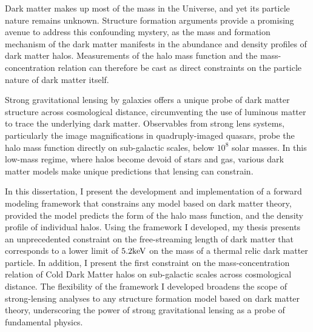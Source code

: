 Dark matter makes up most of the mass in the Universe, and yet its particle nature remains unknown. Structure formation arguments provide a promising avenue to address this confounding mystery, as the mass and formation mechanism of the dark matter manifests in the abundance and density profiles of dark matter halos. Measurements of the halo mass function and the mass-concentration relation can therefore be cast as direct constraints on the particle nature of dark matter itself.

Strong gravitational lensing by galaxies offers a unique probe of dark matter structure across cosmological distance, circumventing the use of luminous matter to trace the underlying dark matter. Observables from strong lens systems, particularly the image magnifications in quadruply-imaged quasars, probe the halo mass function directly on sub-galactic scales, below $10^8$ solar masses. In this low-mass regime, where halos become devoid of stars and gas, various dark matter models make unique predictions that lensing can constrain. 

In this dissertation, I present the development and implementation of a forward modeling framework that constrains any model based on dark matter theory, provided the model predicts the form of the halo mass function, and the density profile of individual halos. Using the framework I developed, my thesis presents an unprecedented constraint on the free-streaming length of dark matter that corresponds to a lower limit of $5.2 \rm{keV}$ on the mass of a thermal relic dark matter particle. In addition, I present the first constraint on the mass-concentration relation of Cold Dark Matter halos on sub-galactic scales across cosmological distance. The flexibility of the framework I developed broadens the scope of strong-lensing analyses to any structure formation model based on dark matter theory, underscoring the power of strong gravitational lensing as a probe of fundamental physics. 